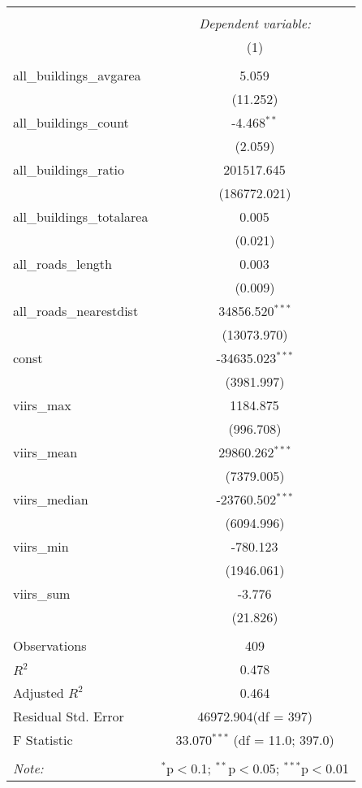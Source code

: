 \begin{table}[!htbp] \centering
\begin{tabular}{@{\extracolsep{5pt}}lc}
\\[-1.8ex]\hline
\hline \\[-1.8ex]
& \multicolumn{1}{c}{\textit{Dependent variable:}} \
\cr \cline{1-2}
\\[-1.8ex] & (1) \\
\hline \\[-1.8ex]
 all_buildings_avgarea & 5.059$^{}$ \\
  & (11.252) \\
 all_buildings_count & -4.468$^{**}$ \\
  & (2.059) \\
 all_buildings_ratio & 201517.645$^{}$ \\
  & (186772.021) \\
 all_buildings_totalarea & 0.005$^{}$ \\
  & (0.021) \\
 all_roads_length & 0.003$^{}$ \\
  & (0.009) \\
 all_roads_nearestdist & 34856.520$^{***}$ \\
  & (13073.970) \\
 const & -34635.023$^{***}$ \\
  & (3981.997) \\
 viirs_max & 1184.875$^{}$ \\
  & (996.708) \\
 viirs_mean & 29860.262$^{***}$ \\
  & (7379.005) \\
 viirs_median & -23760.502$^{***}$ \\
  & (6094.996) \\
 viirs_min & -780.123$^{}$ \\
  & (1946.061) \\
 viirs_sum & -3.776$^{}$ \\
  & (21.826) \\
\hline \\[-1.8ex]
 Observations & 409 \\
 $R^2$ & 0.478 \\
 Adjusted $R^2$ & 0.464 \\
 Residual Std. Error & 46972.904(df = 397)  \\
 F Statistic & 33.070$^{***}$ (df = 11.0; 397.0) \\
\hline
\hline \\[-1.8ex]
\textit{Note:} & \multicolumn{1}{r}{$^{*}$p$<$0.1; $^{**}$p$<$0.05; $^{***}$p$<$0.01} \\
\end{tabular}
\end{table}
